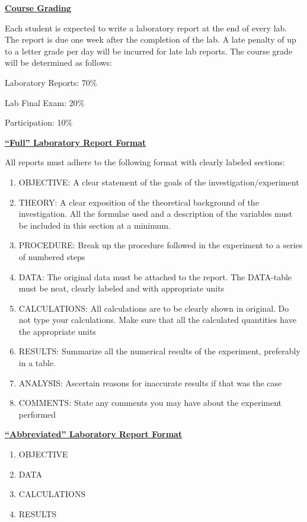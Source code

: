 \documentclass[12pt]{article}
\begin{document}
\underline{\textbf{Course Grading}} \par
Each student is expected to write a laboratory report at the end of every lab.
The report is due one week after the completion of the lab.
A late penalty of up to a letter grade per day will be incurred for late lab reports.
The course grade will be determined as follows: \par
\hfill \break
Laboratory Reports: 70\% \par
Lab Final Exam: 20\% \par
Participation: 10\%
\hfill \break

\underline{\textbf{``Full'' Laboratory Report Format}} \par
All reports must adhere to the following format with clearly labeled sections:
\begin{enumerate}
\item OBJECTIVE: A clear statement of the goals of the investigation/experiment
\item THEORY: A clear exposition of the theoretical background of the investigation. All the formulae used and a description of the variables must be included in this section at a minimum.
\item PROCEDURE: Break up the procedure followed in the experiment to a series of numbered steps
\item DATA: The original data must be attached to the report. The DATA-table must be neat, clearly labeled and with appropriate units
\item CALCULATIONS: All calculations are to be clearly shown in original. Do not type your calculations. Make sure that all the calculated quantities have the appropriate units
\item RESULTS: Summarize all the numerical results of the experiment, preferably in a table.
\item ANALYSIS: Ascertain reasons for inaccurate results if that was the case
\item COMMENTS: State any comments you may have about the experiment performed
\end{enumerate}

\underline{\textbf{``Abbreviated'' Laboratory Report Format}} \par
\begin{enumerate}
\item OBJECTIVE
\item DATA
\item CALCULATIONS
\item RESULTS
\end{enumerate}
\end{document}
